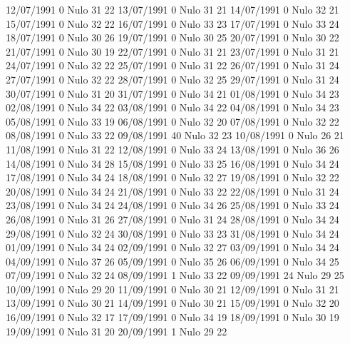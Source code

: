 12/07/1991  0     Nulo    31     22 
13/07/1991  0     Nulo    31     21 
14/07/1991  0     Nulo    32     21 
15/07/1991  0     Nulo    32     22 
16/07/1991  0     Nulo    33     23 
17/07/1991  0     Nulo    33     24 
18/07/1991  0     Nulo    30     26 
19/07/1991  0     Nulo    30     25 
20/07/1991  0     Nulo    30     22 
21/07/1991  0     Nulo    30     19 
22/07/1991  0     Nulo    31     21 
23/07/1991  0     Nulo    31     21 
24/07/1991  0     Nulo    32     22 
25/07/1991  0     Nulo    31     22 
26/07/1991  0     Nulo    31     24 
27/07/1991  0     Nulo    32     22 
28/07/1991  0     Nulo    32     25 
29/07/1991  0     Nulo    31     24 
30/07/1991  0     Nulo    31     20 
31/07/1991  0     Nulo    34     21 
01/08/1991  0     Nulo    34     23 
02/08/1991  0     Nulo    34     22 
03/08/1991  0     Nulo    34     22 
04/08/1991  0     Nulo    34     23 
05/08/1991  0     Nulo    33     19 
06/08/1991  0     Nulo    32     20 
07/08/1991  0     Nulo    32     22 
08/08/1991  0     Nulo    33     22 
09/08/1991  40    Nulo    32     23 
10/08/1991  0     Nulo    26     21 
11/08/1991  0     Nulo    31     22 
12/08/1991  0     Nulo    33     24 
13/08/1991  0     Nulo    36     26 
14/08/1991  0     Nulo    34     28 
15/08/1991  0     Nulo    33     25 
16/08/1991  0     Nulo    34     24 
17/08/1991  0     Nulo    34     24 
18/08/1991  0     Nulo    32     27 
19/08/1991  0     Nulo    32     22 
20/08/1991  0     Nulo    34     24 
21/08/1991  0     Nulo    33     22 
22/08/1991  0     Nulo    31     24 
23/08/1991  0     Nulo    34     24 
24/08/1991  0     Nulo    34     26 
25/08/1991  0     Nulo    33     24 
26/08/1991  0     Nulo    31     26 
27/08/1991  0     Nulo    31     24 
28/08/1991  0     Nulo    34     24 
29/08/1991  0     Nulo    32     24 
30/08/1991  0     Nulo    33     23 
31/08/1991  0     Nulo    34     24 
01/09/1991  0     Nulo    34     24 
02/09/1991  0     Nulo    32     27 
03/09/1991  0     Nulo    34     24 
04/09/1991  0     Nulo    37     26 
05/09/1991  0     Nulo    35     26 
06/09/1991  0     Nulo    34     25 
07/09/1991  0     Nulo    32     24 
08/09/1991  1     Nulo    33     22 
09/09/1991  24    Nulo    29     25 
10/09/1991  0     Nulo    29     20 
11/09/1991  0     Nulo    30     21 
12/09/1991  0     Nulo    31     21 
13/09/1991  0     Nulo    30     21 
14/09/1991  0     Nulo    30     21 
15/09/1991  0     Nulo    32     20 
16/09/1991  0     Nulo    32     17 
17/09/1991  0     Nulo    34     19 
18/09/1991  0     Nulo    30     19 
19/09/1991  0     Nulo    31     20 
20/09/1991  1     Nulo    29     22 
